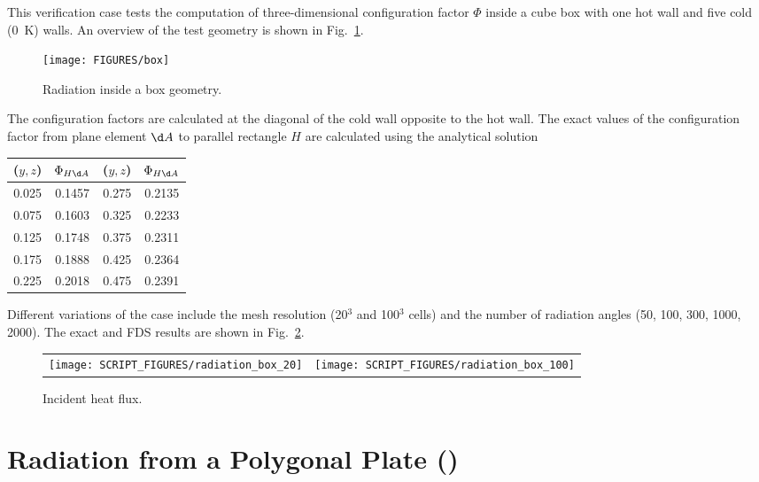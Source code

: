 \documentclass[11pt]{book}
\begin{document}
This verification case tests the computation of three-dimensional configuration factor $\Phi$ inside a cube box with one hot wall and five cold (0~K) walls. An overview of the test geometry is shown in Fig.~\ref{fig_box_radiation}.
\begin{figure}[ht]
\centering
\texttt{[image: FIGURES/box]}
\caption{\label{fig_box_radiation} Radiation inside a box geometry.}
\end{figure}
The configuration factors are calculated at the diagonal of the cold wall opposite to the hot wall. The exact values of the configuration factor from plane element $\d A$ to parallel rectangle $H$ are calculated using the analytical solution~\cite{Siegel:1}
\begin{center}
\begin{tabular}{|c|c|c|c|}
\hline ($y,z$) & $\Phi_{H \d A}$ & ($y,z$) & $\Phi_{H \d A}$ \\ \hline \hline
0.025   &0.1457 & 0.275 &0.2135 \\
0.075   &0.1603 & 0.325 &0.2233 \\
0.125   &0.1748 & 0.375 &0.2311 \\
0.175   &0.1888 & 0.425 &0.2364 \\
0.225   &0.2018 & 0.475 &0.2391 \\ \hline
\end{tabular}
\end{center}
Different variations of the case include the mesh resolution (20$^3$ and 100$^3$ cells) and the number of radiation angles (50, 100, 300, 1000, 2000). The exact and FDS results are shown in Fig.~\ref{fig_incident_heat_flux}.

\begin{figure}[ht]
\centering
\begin{tabular*}{\textwidth}{lr}
\texttt{[image: SCRIPT\_FIGURES/radiation\_box\_20]} &
\texttt{[image: SCRIPT\_FIGURES/radiation\_box\_100]}
\end{tabular*}
\caption{Incident heat flux.}\label{fig_incident_heat_flux}
\end{figure}


\section{Radiation from a Polygonal Plate (\texorpdfstring{}{radiating\_polygon}) }
\label{radiating_polygon}
\end{document}
